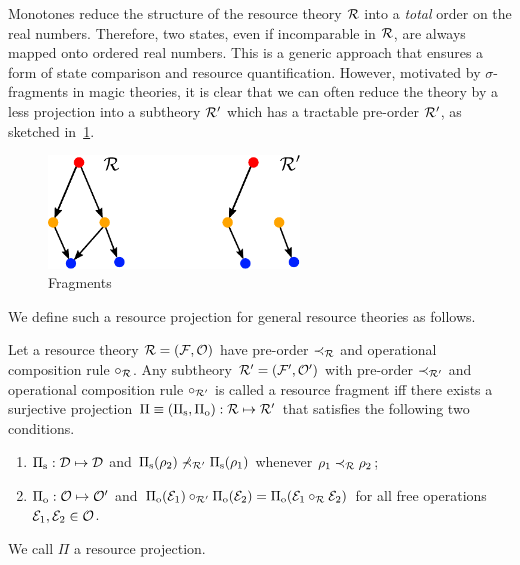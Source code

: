 \documentclass[pra,
aps,
twocolumn,
superscriptaddress,
groupedaddress,
nofootinbib,
reprint
]{revtex4-1}
\begin{document}
Monotones reduce the structure of the resource theory $\mathcal{R}$ into a \emph{total} order on the real numbers.
Therefore, two states, even if incomparable in $\mathcal{R}$, are always mapped onto ordered real numbers.
This is a generic approach that ensures a form of state comparison and resource quantification.
However, motivated by $\sigma$-fragments in magic theories, it is clear that we can often reduce the theory by a less  projection into a subtheory $\mathcal{R}'$ which has a tractable pre-order $\mathcal{R}'$, as sketched in~\cref{fig:fragments}.
\begin{figure}[t]
    \centering
    \includegraphics[height=3cm]{figs/fragments.pdf}
    \caption{Fragments 
    }
    \label{fig:fragments}
\end{figure}
We define such a resource projection for general resource theories as follows.
\begin{definition}\label{def:fragment}
    Let a resource theory $\mathcal{R} = (\mathcal{F}, \mathcal{O})$ have pre-order $\prec_{\mathcal{R}}$ and operational composition rule $\circ_{\mathcal{R}}$. 
    Any subtheory $\mathcal{R}' = (\mathcal{F}', \mathcal{O}')$ with pre-order $\prec_{\mathcal{R}'}$ and operational composition rule $\circ_{\mathcal{R}'}$ is called a resource fragment iff there exists a surjective projection $\Pi \equiv (\Pi_{\rm{s}}, \Pi_{\rm{o}}): \mathcal{R} \mapsto \mathcal{R}'$ that satisfies the following two conditions.
    \begin{enumerate}
        \item $\Pi_{\rm{s}}: \mathcal{D} \mapsto \mathcal{D}$ and $\Pi_{\rm{s}}(\rho_2) \nprec_{\mathcal{R}'} \Pi_{\rm{s}}(\rho_1)$ whenever $\rho_1 \prec_{\mathcal{R}} \rho_2$;
        \item $\Pi_{\rm{o}}: \mathcal{O} \mapsto \mathcal{O}'$ and $\Pi_{\rm{o}}(\mathcal{E}_1) \circ_{\mathcal{R}'} \Pi_{\rm{o}}(\mathcal{E}_2) = \Pi_{\rm{o}}(\mathcal{E}_1 \circ_{\mathcal{R}} \mathcal{E}_2)$ for all free operations $\mathcal{E}_1, \mathcal{E}_2 \in \mathcal{O}$.
    \end{enumerate}
    We call $\Pi$ a resource projection.
\end{definition}

\end{document}
